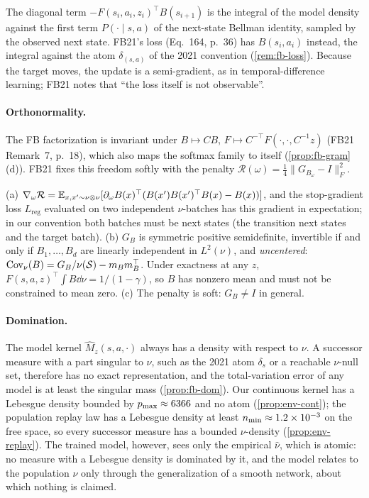 The diagonal term $-F(s_i,a_i,z_i)^\top B(s_{i+1})$ is the integral of the model density against the first term $P(\cdot\mid s,a)$ of the next-state Bellman identity, sampled by the observed next state. FB21's loss (Eq.~164, p.~36) has $B(s_i,a_i)$ instead, the integral against the atom $\delta_{(s,a)}$ of the 2021 convention (\cref{rem:fb-loss}).
Because the target moves, the update is a semi-gradient, as in temporal-difference learning; FB21 notes that ``the loss itself is not observable''.

\paragraph{Orthonormality.}
The FB factorization is invariant under $B\mapsto CB$, $F\mapsto C^{-\top}F(\cdot,\cdot,C^{-1}z)$ (FB21 Remark~7, p.~18), which also maps the softmax family to itself (\cref{prop:fb-gram}(d)). FB21 fixes this freedom softly with the penalty $\mathcal R(\omega)=\frac14\lVert G_{B_\omega}-I\rVert_F^2$.

\begin{proposition}\label{prop:m-fb-orth}
(a) $\nabla_\omega\mathcal R=\E_{x,x'\sim\nu\otimes\nu}[\partial_\omega B(x)^\top(B(x')B(x')^\top B(x)-B(x))]$, and the stop-gradient loss $L_{\mathrm{reg}}$ evaluated on two independent $\nu$-batches has this gradient in expectation; in our convention both batches must be next states (the transition next states and the target batch).
(b) $G_B$ is symmetric positive semidefinite, invertible if and only if $B_1,\dots,B_d$ are linearly independent in $L^2(\nu)$, and \emph{uncentered}: $\Cov_\nu(B)=G_B/\nu(\cS)-m_Bm_B^\top$. Under exactness at any $z$, $F(s,a,z)^\top\int B\dd\nu=1/(1-\gamma)$, so $B$ has nonzero mean and must not be constrained to mean zero.
(c) The penalty is soft: $G_B\ne I$ in general.
\end{proposition}

\paragraph{Domination.}
The model kernel $\hat M_z(s,a,\cdot)$ always has a density with respect to $\nu$. A successor measure with a part singular to $\nu$, such as the 2021 atom $\delta_s$ or a reachable $\nu$-null set, therefore has no exact representation, and the total-variation error of any model is at least the singular mass (\cref{prop:fb-dom}).
Our continuous kernel has a Lebesgue density bounded by $p_{\max}\approx\vn{const.p_max}{6366}$ and no atom (\cref{prop:env-cont}); the population replay law has a Lebesgue density at least $n_{\min}\approx\vn{const.n_min}{1.2\times10^{-3}}$ on the free space, so every successor measure has a bounded $\nu$-density (\cref{prop:env-replay}).
The trained model, however, sees only the empirical $\hat\nu$, which is atomic: no measure with a Lebesgue density is dominated by it, and the model relates to the population $\nu$ only through the generalization of a smooth network, about which nothing is claimed.

